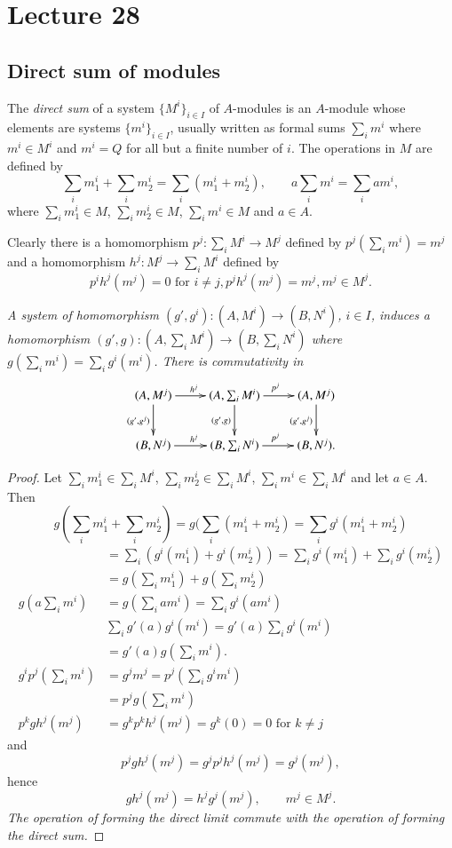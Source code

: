 \chapter{Lecture 28}  %

\section*{Direct sum of modules}\pageoriginale

\begin{defi*}%
The {\em direct sum} of a system $\{ M^i \}_{i \in I}$ of $A$-modules
is an $A$-module whose elements are systems $\{ m^i \}_{i \in I}$,
usually written as formal sums $\sum _i m^i$ where $m^i \in M^i$ and
$m^i=Q$ for all but a finite number of $i$. The operations in $M$ are
defined by  
$$
\sum_i m^i_1+\sum_im^i_2=\sum_i(m^i_1+m^i_2), \qquad a \sum_i 
m^i=\sum_iam^i, 
$$
where $\sum_im^i_1 \in M$, $\sum_i m^i_2\in M$, $\sum_im^i \in M$ and $a \in 
A$. 
\end{defi*}

Clearly there is a homomorphism $p^j:\sum_i M^i \to M^j$ defined by
$p^j(\sum _i m^i)=m^j$ and a homomorphism $h^j:M^j \to \sum_iM^i$
defined by 
$$
p^i h^j(m^j)=0 \text { for } i \neq j, p^jh^j(m^j)=m^j,m^j \in M^j. 
$$

\textit{A system of homomorphism $(g',g^i):(A,M^i)\to (B,N^i)$, $i \in
  I$, induces a homomorphism $(g',g):(A, \sum _iM^i) \to (B, \sum_i
  N^i)$ where\break $g(\sum_i m^i)=\sum_i g^i(m^i)$. There is commutativity
  in} 
\[
\xymatrix{
(A,M^j) \ar[r]^{h^j}\ar[d]_{(g',g^j)} & (A,\sum_i M^i) \ar[r]^{p^j}
  \ar[d]_{(g',g)} & (A,M^j)\ar[d]_{(g',g^j)} \\
(B,N^j) \ar[r]^{h^j} & (B,\sum_i N^i) \ar[r]^{p^j} & (B,N^j).
}
\]

\begin{proof}
Let $\sum _im^i_1 \in \sum_iM^i$, $\sum_im^i_2 \in \sum_iM^i$, $\sum_im^i
\in \sum_i M^i$ and let $a \in A$. Then 
$$
g(\sum_im^i_1+\sum_im^i_2)=g(\sum_i(m^i_1+m^i_2)=\sum
_{i}g^i(m^i_1+m^i_2) 
$$\pageoriginale
\begin{align*}
&=\sum_i(g^i(m^i_1) + g^i(m^i_2))=\sum_i g^i(m^i_1)+\sum_i g^i(m^i_2)\\
&=g(\sum _i m^i_1)+g (\sum_i m^i_2)\\
g(a \sum _i m^i)&= g (\sum_i a m^i) = \sum_i g^i (am^i)\\
& \sum_i g'(a)g^i(m^i)=g'(a)\sum_i g^i(m^i)\\
&=g'(a)g(\sum _i m^i).\\
g^ip^j(\sum_i m^i)&=g^jm^j=p^j(\sum_i g^im^i)\\
&=p^jg(\sum_i m^i)\\
p^kgh^j(m^j)&=g^kp^kh^j(m^j)=g^k(0)=0 \text{ for } k \neq j
\end{align*}
and 
$$
p^jgh^j(m^j)=g^jp^jh^j(m^j)=g^j(m^j),
$$
hence
$$
g h^j(m^j)=h^jg^j(m^j),\qquad m^j \in M^j.
$$
\textit{The operation of forming the direct limit commute with the
  operation of forming the direct sum.} 
\end{proof}

